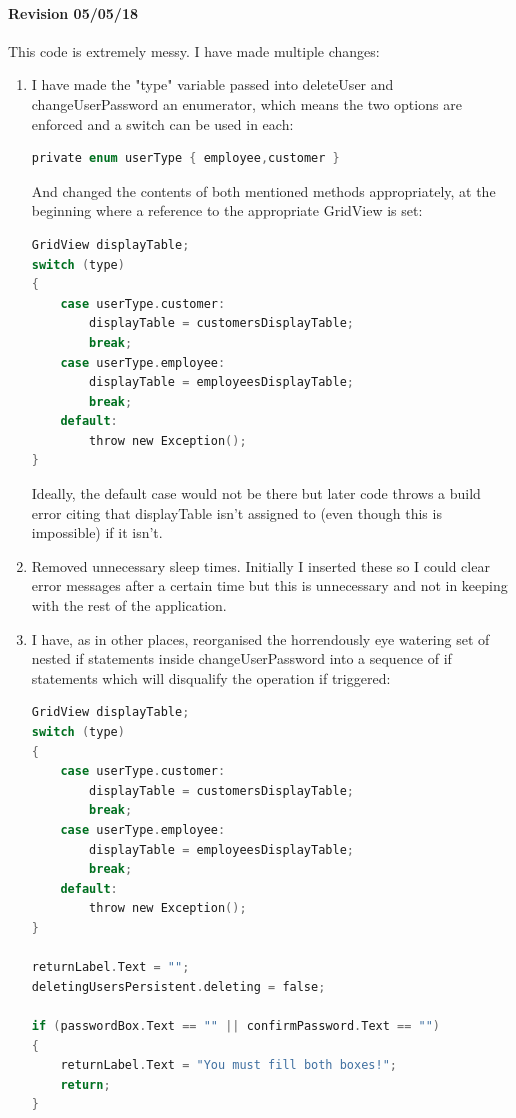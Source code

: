 ﻿\documentclass{article}
\begin{document}
    \paragraph{Revision 05/05/18}
    This code is extremely messy.
    I have made multiple changes:
    \begin{enumerate}
        \item I have made the "type" variable passed into deleteUser and changeUserPassword an enumerator, which means the two options are enforced and a switch can be used in each:
        \begin{lstlisting}[language=C]
private enum userType { employee,customer }
        \end{lstlisting}
        And changed the contents of both mentioned methods appropriately, at the beginning where a reference to the appropriate GridView is set:
        \begin{lstlisting}[language=C]
GridView displayTable;
switch (type)
{
    case userType.customer:
        displayTable = customersDisplayTable;
        break;
    case userType.employee:
        displayTable = employeesDisplayTable;
        break;
    default:
        throw new Exception();
}
        \end{lstlisting}
        Ideally, the default case would not be there but later code throws a build error citing that displayTable isn't assigned to (even though this is impossible) if it isn't.
        \item Removed unnecessary sleep times.
        Initially I inserted these so I could clear error messages after a certain time but this is unnecessary and not in keeping with the rest of the application.
        \item I have, as in other places, reorganised the horrendously eye watering set of nested if statements inside changeUserPassword into a sequence of if statements which will disqualify the operation if triggered:
        \begin{lstlisting}[language=C]
GridView displayTable;
switch (type)
{
    case userType.customer:
        displayTable = customersDisplayTable;
        break;
    case userType.employee:
        displayTable = employeesDisplayTable;
        break;
    default:
        throw new Exception();
}

returnLabel.Text = "";
deletingUsersPersistent.deleting = false;

if (passwordBox.Text == "" || confirmPassword.Text == "")
{
    returnLabel.Text = "You must fill both boxes!";
    return;
}


\end{lstlisting}
\end{enumerate}
\end{document}
